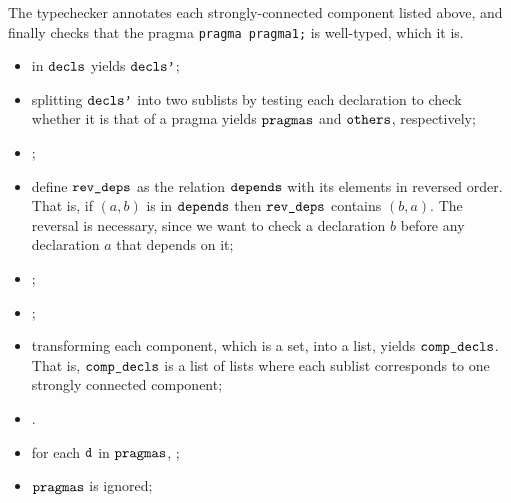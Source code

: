 The typechecker annotates each strongly-connected component listed above,
and finally checks that the pragma \verb|pragma pragma1;| is well-typed, which it is.

\ProseParagraph
\AllApply
\begin{itemize}
  \item \Proseoverridesubprograms{} in $\texttt{decls}$ yields $\texttt{decls'}$;
  \item splitting $\texttt{decls'}$ into two sublists by testing each declaration to check whether
        it is that of a pragma yields $\texttt{pragmas}$ and $\texttt{others}$, respectively;
  \item {};
  \item define $\reverseddependencies$ as the relation $\texttt{depends}$ with its elements in reversed order.
        That is, if $(a,b)$ is in $\texttt{depends}$ then $\reverseddependencies$ contains $(b, a)$.
        The reversal is necessary, since we want to check a declaration $b$ before any declaration $a$
        that depends on it;
  \item {};
  \item \Prosetopologicalorderingcomps{$\comps$}{$\reverseddependencies$}{$\orderedcomps$};
  \item transforming each component, which is a set, into a list, yields $\compdecls$.
        That is, $\compdecls$ is a list of lists where each sublist corresponds to one
        strongly connected component;
  \item \Proseannotatedeclcomps{$\genv$}{$\compdecls$}{$\newdecls$}{$\newtenv$\ProseOrTypeError}.
  \item for each $\vd$ in $\texttt{pragmas}$, \Prosecheckglobalpragma{$\newtenv$}{$\vd$}\ProseOrTypeError;
  \item $\texttt{pragmas}$ is ignored;
\end{itemize}

